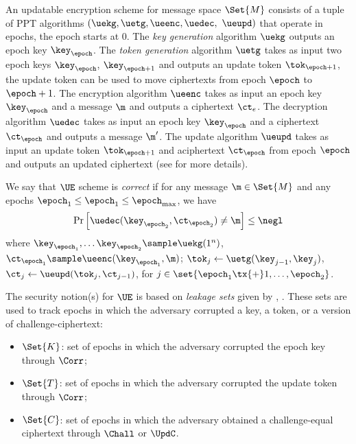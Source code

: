 \documentclass{fundam}
\begin{document}
\vspace{0.1cm}
An updatable encryption scheme for message space $\Set{M}$ consists of a tuple of PPT  algorithms $(\uekg,\uetg,\ueenc, \uedec,$ $\ueupd)$ that operate in epochs, the epoch starts at $0$. The \textit{key generation} algorithm $\uekg$ outputs an epoch key $\key_{\epoch}$. The \textit{token generation} algorithm $\uetg$ takes as input two epoch keys $\key_{\epoch}$, $\key_{\epoch+1}$ and outputs an update token $\tok_{\epoch+1}$, the update token can be used to move ciphertexts from epoch $\epoch$ to $\epoch+1$. The encryption algorithm $\ueenc$ takes as input an epoch key $\key_{\epoch}$ and a message $\m$ and outputs a ciphertext $\ct_{e}$. The decryption algorithm $\uedec$ takes as input an epoch key $\key_{\epoch}$ and a ciphertext $\ct_{\epoch}$ and outputs a message $\m'$. The update algorithm $\ueupd$ takes as input an update token $\tok_{\epoch+1}$ and aciphertext $\ct_{\epoch}$ from epoch $\epoch$ and outputs an updated ciphertext (see \cite{jiang2020} for more details).

\vspace{0.1cm}
We say that $\UE$ scheme is \textit{correct} if for any message $\m\in\Set{M}$ and any epochs $\epoch_{1}\leq \epoch_{1} \leq \epoch_{\max}$, we have
$$\Pr\left[  \uedec(\key_{\epoch_{2}}, \ct_{\epoch_{2}}) \neq \m \right]\leq \negl$$
where $\key_{\epoch_{1}}, \ldots \key_{\epoch_{2}} \sample \uekg(1^{n})$, $\ct_{\epoch_{1}}\sample \ueenc(\key_{\epoch_{1}}, \m)$; $\tok_{j}\gets \uetg(\key_{j-1}, \key_{j})$,\\ $\ct_{j}\gets \ueupd(\tok_{j}, \ct_{j-1})$, for $j\in \set{\epoch_{1}\tx{+}1, \ldots ,\epoch_{2} }$.

\vspace{0.1cm}
The security notion(s) for $\UE$ is based on \textit{leakage sets} given by \cite{klooss2019r}, \cite{jiang2020}. These sets are used to track epochs in which the adversary corrupted a key, a token, or a version of challenge-ciphertext:
\begin{itemize}
\item $\Set{K}$: set of epochs in which the adversary corrupted the epoch key through $\Corr$; 
\item $\Set{T}$: set of epochs in which the adversary corrupted the update token through $\Corr$; 
\item $\Set{C}$: set of epochs in which the adversary obtained a challenge-equal ciphertext through $\Chall$ or $\UpdC$.
\end{itemize}
\end{document}
